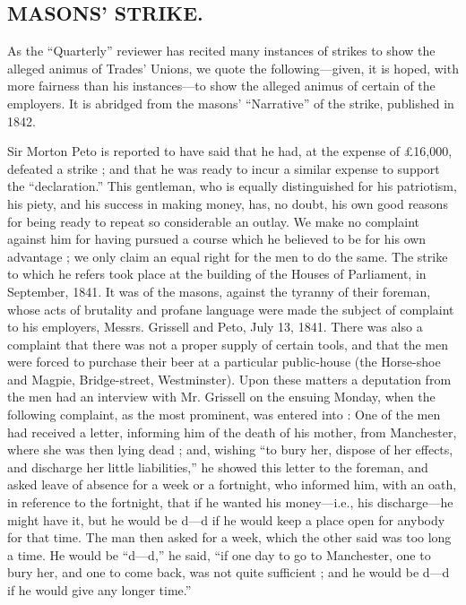 \subsection{MASONS' STRIKE.}

As the ``Quarterly'' reviewer has recited many instances of
strikes to show the alleged animus of Trades' Unions, we quote the
following---given, it is hoped, with more fairness than his
instances---to show the alleged animus of certain of the employers. It
is abridged from the masons' ``Narrative'' of the strike, published in
1842.

Sir Morton Peto is reported to have said that he had, at the expense of
£16,000, defeated a strike ; and that he was ready to incur a similar
expense to support the ``declaration.'' This gentleman, who is equally
distinguished for his patriotism, his piety, and his success in making
money, has, no doubt, his own good reasons for being ready to repeat so
considerable an outlay. We make no complaint against him for having
pursued a course which he believed to be for his own advantage ; we only
claim an equal right for the men to do the same. The strike to which he
refers took place at the building of the Houses of Parliament, in
September, 1841. It was of the masons, against the tyranny of their
foreman, whose acts of brutality and profane language were made the
subject of complaint to his employers, Messrs. Grissell and Peto, July
13, 1841. There was also a complaint that there was not a proper supply
of certain tools, and that the men were forced to purchase their beer at
a particular public-house (the Horse-shoe and Magpie, Bridge-street,
Westminster). Upon these matters a deputation from the men had an
interview with Mr. Grissell on the ensuing Monday, when the following
complaint, as the most prominent, was entered into : One of the men had
received a letter, informing him of the death of his mother, from
Manchester, where she was then lying dead ; and, wishing ``to bury her,
dispose of her effects, and discharge her little liabilities,'' he
showed this letter to the foreman, and asked leave of absence for a week
or a fortnight, who informed him, with an oath, in reference to the
fortnight, that if he wanted his money---i.e., his discharge---he might
have it, but he would be d---d if he would keep a place open for
anybody for that time. The man then asked for a week, which the other
said was too long a time. He would be ``d---d,'' he said, ``if one day
to go to Manchester, one to bury her, and one to come back, was not
quite sufficient ; and he would be d---d if he would give any longer
time.''

